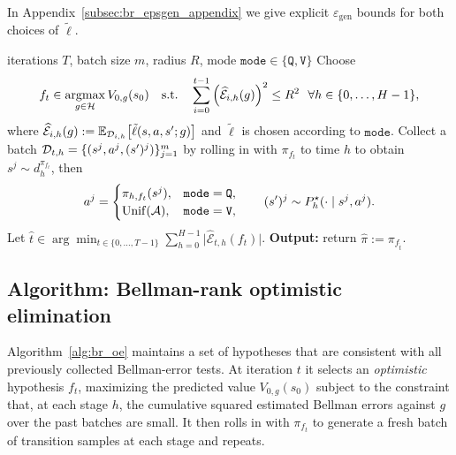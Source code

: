 In Appendix~\ref{subsec:br_epsgen_appendix} we give explicit $\varepsilon_{\mathrm{gen}}$ bounds for both
choices of $\tilde{\ell}$.

\begin{algorithm}[t]
\begin{algorithmic}[1]
\Require iterations $T$, batch size $m$, radius $R$, mode $\mathtt{mode}\in\{\mathtt{Q},\mathtt{V}\}$
    \State Choose
    \[
    f_t \in \operatorname*{argmax}_{g\in\mathcal{H}} V_{0,g}(s_0)
    \quad \text{s.t.}\quad
    \sum_{i=0}^{t-1}\Big(\widehat{\mathcal{E}}_{i,h}(g)\Big)^2 \le R^2
    \ \ \forall h\in\{0,\dots,H-1\},
    \]
    where $\widehat{\mathcal{E}}_{i,h}(g):=\mathbb{E}_{\mathcal{D}_{i,h}}\big[\tilde{\ell}(s,a,s';g)\big]$
    and $\tilde{\ell}$ is chosen according to $\mathtt{mode}$.
        \State Collect a batch $\mathcal{D}_{t,h}=\{(s^j,a^j,(s')^j)\}_{j=1}^m$ by rolling in with $\pi_{f_t}$ to time $h$
        to obtain $s^j\sim d_h^{\pi_{f_t}}$, then
        \[
        a^j=
        \begin{cases}
        \pi_{h,f_t}(s^j), & \mathtt{mode}=\mathtt{Q},\\
        \mathrm{Unif}(\mathcal{A}), & \mathtt{mode}=\mathtt{V},
        \end{cases}
        \qquad
        (s')^j\sim P_h^\star(\cdot\mid s^j,a^j).
        \]
    \EndFor
\EndFor
\State Let $\hat t\in\arg\min_{t\in\{0,\dots,T-1\}}\sum_{h=0}^{H-1}\big|\widehat{\mathcal{E}}_{t,h}(f_t)\big|$.
\State \textbf{Output:} return $\hat\pi := \pi_{f_{\hat t}}$.
\end{algorithmic}
\caption{Bellman-rank optimistic elimination (Q/V versions)}
\label{alg:br_oe}
\end{algorithm}

\subsection{Algorithm: Bellman-rank optimistic elimination}
\label{subsec:br_algorithm}

Algorithm~\ref{alg:br_oe} maintains a set of hypotheses that are consistent with all previously
collected Bellman-error tests.  At iteration $t$ it selects an \emph{optimistic} hypothesis $f_t$,
maximizing the predicted value $V_{0,g}(s_0)$ subject to the constraint that, at each stage $h$,
the cumulative squared estimated Bellman errors against $g$ over the past batches are small.
It then rolls in with $\pi_{f_t}$ to generate a fresh batch of
transition samples at each stage and repeats. 

